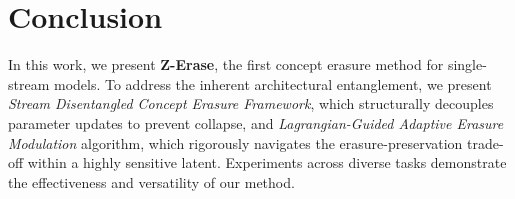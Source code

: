 \section{Conclusion}

In this work, we present \textbf{Z-Erase}, the first concept erasure method for single-stream models. To address the inherent architectural entanglement, we present \emph{Stream Disentangled Concept Erasure Framework}, which structurally decouples parameter updates to prevent collapse, and \emph{Lagrangian-Guided Adaptive Erasure Modulation} algorithm, which rigorously navigates the erasure-preservation trade-off within a highly sensitive latent. Experiments across diverse tasks demonstrate the effectiveness and versatility of our method.